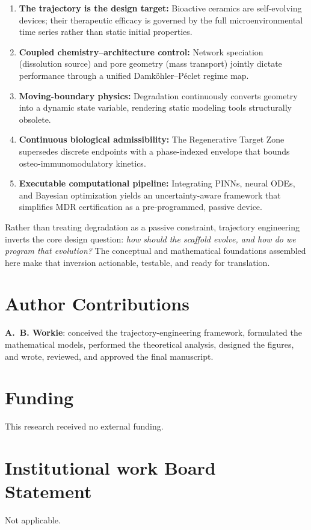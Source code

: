 \documentclass[11pt]{article}
\begin{document}
\begin{enumerate}[leftmargin=1.6em,itemsep=2pt]
\item \textbf{The trajectory is the design target:} Bioactive ceramics are self-evolving devices; their therapeutic efficacy is governed by the full microenvironmental time series rather than static initial properties.
\item \textbf{Coupled chemistry--architecture control:} Network speciation (dissolution source) and pore geometry (mass transport) jointly dictate performance through a unified Damk\"ohler--P\'eclet regime map.
\item \textbf{Moving-boundary physics:} Degradation continuously converts geometry into a dynamic state variable, rendering static modeling tools structurally obsolete.
\item \textbf{Continuous biological admissibility:} The Regenerative Target Zone supersedes discrete endpoints with a phase-indexed envelope that bounds osteo-immunomodulatory kinetics.
\item \textbf{Executable computational pipeline:} Integrating PINNs, neural ODEs, and Bayesian optimization yields an uncertainty-aware framework that simplifies MDR certification as a pre-programmed, passive device.
\end{enumerate}

Rather than treating degradation as a passive constraint, trajectory engineering inverts the core design question: \emph{how should the scaffold evolve, and how do we program that evolution?} The conceptual and mathematical foundations assembled here make that inversion actionable, testable, and ready for translation.

\newpage
\section*{Author Contributions}
\textbf{A.~B. Workie}: conceived the trajectory-engineering framework, formulated the mathematical models, performed the theoretical analysis, designed the figures, and wrote, reviewed, and approved the final manuscript.

\section*{Funding}
This research received no external funding.

\section*{Institutional work Board Statement}
Not applicable.
\end{document}
